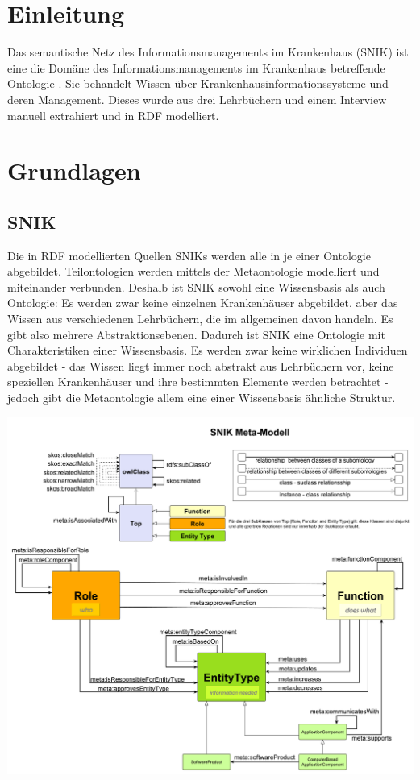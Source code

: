 \documentclass[utf8,biblatex]{lni}
\begin{document}
%

\section{Einleitung}

Das semantische Netz des Informationsmanagements im Krankenhaus (SNIK) ist eine
die Domäne des Informationsmanagements im Krankenhaus betreffende Ontologie \cite{domaene}.
Sie behandelt Wissen über Krankenhausinformationssysteme und deren Management.
Dieses wurde aus drei Lehrbüchern \cite{bb,ob,he} und einem Interview \cite{ciosurvey} manuell extrahiert und in RDF modelliert.

\section{Grundlagen}

\subsection{SNIK}

Die in RDF modellierten Quellen SNIKs werden alle in je einer Ontologie abgebildet.
Teilontologien werden mittels der Metaontologie modelliert und miteinander verbunden.
Deshalb ist SNIK sowohl eine Wissensbasis als auch Ontologie:
Es werden zwar keine einzelnen Krankenhäuser abgebildet, aber das Wissen aus verschiedenen Lehrbüchern, die im allgemeinen davon handeln.
Es gibt also mehrere Abstraktionsebenen.
Dadurch ist SNIK eine Ontologie mit Charakteristiken einer Wissensbasis.
Es werden zwar keine wirklichen Individuen abgebildet
- das Wissen liegt immer noch abstrakt aus Lehrbüchern vor, keine speziellen Krankenhäuser und ihre bestimmten Elemente werden betrachtet -
jedoch gibt die Metaontologie allem eine einer Wissensbasis ähnliche Struktur.

\includegraphics[width=\linewidth]{../Dokumentation/Images/snik-metamodel.pdf}\label{fig:snik-metamodel}
\end{document}
